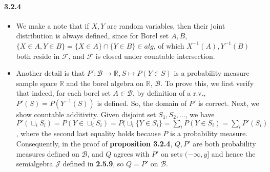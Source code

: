 \documentclass[a4paper]{article}
\newcommand{\alg}[0]{\mathcal{F}} %
\newcommand{\borel}[0]{\mathcal{B}} %
\newcommand{\semialg}[0]{\mathcal{J}} %
\newcommand{\real}[0]{\mathbb{R}} %
\newcommand{\infseq}[1]{#1_1,#1_2,\dots} %
\begin{document}
\paragraph{3.2.4} 
\begin{itemize} 
	\item We make a note that if $X, Y$ are random variables, then their joint distribution is always defined, since for Borel set $A, B$, $\{X\in A, Y\in B\} = \{X\in A\}\cap \{Y\in B\}\in alg$, of which $X^{-1}(A), Y^{-1}(B)$ both reside in $\alg$, and $\alg$ is closed under countable intersection.
	\item Another detail is that $P':\borel\rightarrow\real,S\mapsto P(Y\in S)$ is a probability measure sample space $\real$ and the borel algebra on $\real$, $\borel$. To prove this, we first verify that indeed, for each borel set $A\in\borel$, by definition of a r.v., $P'(S) = P(Y^{-1}(S))$ is defined. So, the domain of $P'$ is correct. Next, we show countable additivity. Given disjoint set $\infseq{S}$, we have $P'(\sqcup_i S_i) = P(Y\in \sqcup_i S_i) = P(\sqcup_i \{Y\in S_i\} = \sum_i P(Y\in S_i) = \sum_i P'(S_i)$, where the second last equality holds because $P$ is a probability measure.\\
	Consequently, in the proof of \textbf{proposition 3.2.4}, $Q,P'$ are both probability measures defined on $\borel$, and $Q$ agrees with $P'$ on sets $(-\infty,y]$ and hence the semialgebra $\semialg$ defined in \textbf{2.5.9}, so $Q=P'$ on $\borel$.
\end{itemize}
\end{document}
